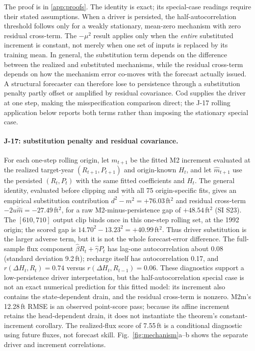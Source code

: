 The proof is in \ref{app:proofs}. The identity is exact; its special-case readings require their stated assumptions. When a driver is persisted, the half-autocorrelation threshold follows only for a weakly stationary, mean-zero mechanism with zero residual cross-term. The $-\mu^2$ result applies only when the \emph{entire} substituted increment is constant, not merely when one set of inputs is replaced by its training mean. In general, the substitution term depends on the difference between the realized and substituted mechanisms, while the residual cross-term depends on how the mechanism error co-moves with the forecast actually issued. A structural forecaster can therefore lose to persistence through a substitution penalty partly offset or amplified by residual covariance. Cod supplies the driver at one step, making the misspecification comparison direct; the J-17 rolling application below reports both terms rather than imposing the stationary special case.

\paragraph{J-17: substitution penalty and residual covariance.} For each one-step rolling origin, let $m_{t+1}$ be the fitted M2 increment evaluated at the realized target-year $(R_{t+1},P_{t+1})$ and origin-known $H_t$, and let $\hat m_{t+1}$ use the persisted $(R_t,P_t)$ with the same fitted coefficients and $H_t$. The general identity, evaluated before clipping and with all 75 origin-specific fits, gives an empirical substitution contribution $\overline{d^2-m^2}=+76.03$\,ft$^2$ and residual cross-term $-2\overline{u\hat m}=-27.49$\,ft$^2$, for a raw M2-minus-persistence gap of $+48.54$\,ft$^2$ (SI S23). The $[610,710]$ output clip binds once in this one-step rolling set, at the 1992 origin; the scored gap is $14.70^2-13.23^2=+40.99$\,ft$^2$. Thus driver substitution is the larger adverse term, but it is not the whole forecast-error difference. The full-sample flux component $\hat\beta R_t+\hat\gamma P_t$ has lag-one autocorrelation about 0.08 (standard deviation 9.2\,ft); recharge itself has autocorrelation 0.17, and $r(\Delta H_t,R_t)=0.74$ versus $r(\Delta H_t,R_{t-1})=0.06$. These diagnostics support a low-persistence driver interpretation, but the half-autocorrelation special case is not an exact numerical prediction for this fitted model: its increment also contains the state-dependent drain, and the residual cross-term is nonzero. M2m's 12.28\,ft RMSE is an observed point-score pass; because its affine increment retains the head-dependent drain, it does not instantiate the theorem's constant-increment corollary. The realized-flux score of 7.55\,ft is a conditional diagnostic using future fluxes, not forecast skill. Fig.~\ref{fig:mechanism}a--b shows the separate driver and increment correlations.

